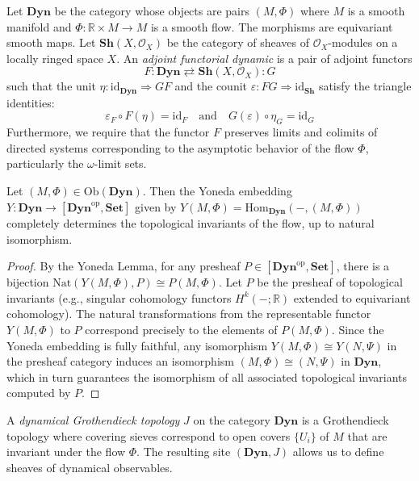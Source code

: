 \begin{definition}
\label{def:adj_dyn}
Let $\mathbf{Dyn}$ be the category whose objects are pairs $(M, \Phi)$ where $M$ is a smooth manifold and $\Phi: \mathbb{R} \times M \to M$ is a smooth flow. The morphisms are equivariant smooth maps. Let $\mathbf{Sh}(X, \mathcal{O}_X)$ be the category of sheaves of $\mathcal{O}_X$-modules on a locally ringed space $X$. An \emph{adjoint functorial dynamic} is a pair of adjoint functors
\[ F: \mathbf{Dyn} \rightleftarrows \mathbf{Sh}(X, \mathcal{O}_X) : G \]
such that the unit $\eta: \text{id}_{\mathbf{Dyn}} \Rightarrow GF$ and the counit $\varepsilon: FG \Rightarrow \text{id}_{\mathbf{Sh}}$ satisfy the triangle identities:
\[ \varepsilon_F \circ F(\eta) = \text{id}_F \quad \text{and} \quad G(\varepsilon) \circ \eta_G = \text{id}_G \]
Furthermore, we require that the functor $F$ preserves limits and colimits of directed systems corresponding to the asymptotic behavior of the flow $\Phi$, particularly the $\omega$-limit sets.
\end{definition}

\begin{lemma}
\label{lem:yoneda_flow}
Let $(M, \Phi) \in \text{Ob}(\mathbf{Dyn})$. Then the Yoneda embedding $Y: \mathbf{Dyn} \to [\mathbf{Dyn}^\text{op}, \mathbf{Set}]$ given by $Y(M, \Phi) = \text{Hom}_{\mathbf{Dyn}}(-, (M, \Phi))$ completely determines the topological invariants of the flow, up to natural isomorphism.
\end{lemma}

\begin{proof}
By the Yoneda Lemma, for any presheaf $P \in [\mathbf{Dyn}^\text{op}, \mathbf{Set}]$, there is a bijection $\text{Nat}(Y(M, \Phi), P) \cong P(M, \Phi)$. Let $P$ be the presheaf of topological invariants (e.g., singular cohomology functors $H^k(-; \mathbb{R})$ extended to equivariant cohomology). The natural transformations from the representable functor $Y(M, \Phi)$ to $P$ correspond precisely to the elements of $P(M, \Phi)$. Since the Yoneda embedding is fully faithful, any isomorphism $Y(M, \Phi) \cong Y(N, \Psi)$ in the presheaf category induces an isomorphism $(M, \Phi) \cong (N, \Psi)$ in $\mathbf{Dyn}$, which in turn guarantees the isomorphism of all associated topological invariants computed by $P$.
\end{proof}

\begin{definition}
A \emph{dynamical Grothendieck topology} $J$ on the category $\mathbf{Dyn}$ is a Grothendieck topology where covering sieves correspond to open covers $\{U_i\}$ of $M$ that are invariant under the flow $\Phi$. The resulting site $(\mathbf{Dyn}, J)$ allows us to define sheaves of dynamical observables.
\end{definition}

